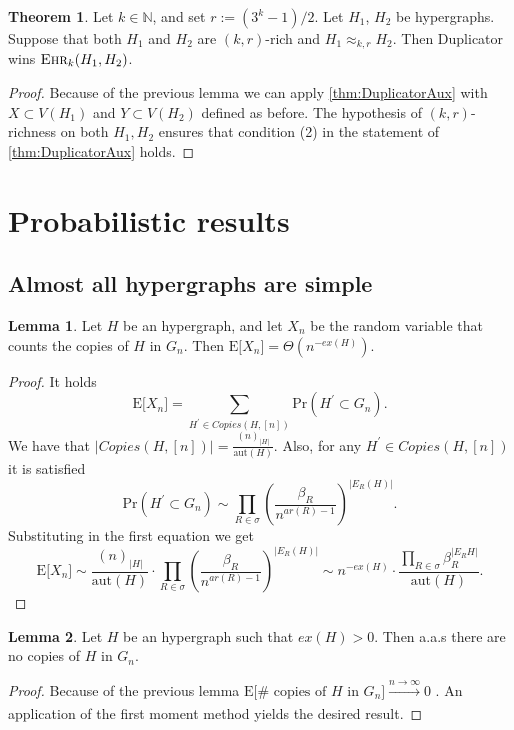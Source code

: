 \documentclass[12pt,notitlepage,a4paper]{article}
\theoremstyle{definition}
\newtheorem{theorem}{Theorem}[section]
\newtheorem{lemma}{Lemma}[section]
\newcommand{\N}{\mathbb{N}}
\newcommand{\ehr}{\textsc{Ehr}}
\newcommand{\PR}[1]{\mathrm{Pr}\left(#1\right)}
\newcommand{\sep}{\noindent\rule{2cm}{0.4pt}}
\newcommand{\aut}{\mathrm{aut}}
\begin{document}
\begin{theorem}\label{thm:Duplicatorwins}
	Let $k\in \N$, and set $r:=(3^k-1)/2$.
	Let $H_1$, $H_2$ be hypergraphs.
	Suppose
	that both $H_1$ and $H_2$ are $(k,r)$-rich and
	$H_1\approx_{k,r} H_2$. Then Duplicator wins $\ehr_{k}(H_1,H_2)$.
\end{theorem}
	\begin{proof}
		Because of the previous lemma we can apply 
		\cref{thm:DuplicatorAux} with $X\subset V(H_1)$ 
		and	$Y\subset V(H_2)$ defined as before. The
		hypothesis of $(k,r)$-richness on both $H_1, H_2$ ensures that
		condition (2) in the statement of \cref{thm:DuplicatorAux}
		holds. 
	\end{proof}


\section{Probabilistic results}



\subsection{Almost all hypergraphs are simple}

\begin{lemma}
	Let $H$ be an hypergraph, and let $X_n$ be the 
	random variable that counts the copies of $H$ in 
	$G_n$. Then 
	$\mathrm{E}\big[X_n\big]=\Theta(n^{-ex(H)})$.  
\end{lemma}
\begin{proof}
It holds
\[
 \mathrm{E}\big[X_n\big]=
 \sum_{H^\prime \in Copies(H,[n])} \PR{H^\prime \subset G_n}.
\]	
We have that $\Big|Copies(H,[n])\Big|=\frac{(n)_{|H|}}{\aut(H)}$. Also, 
for any $H^\prime \in Copies(H,[n])$ it is satisfied
\[
\PR{H^\prime \subset G_n}\sim \prod_{R\in \sigma} \left(\frac{\beta_R}{n^{ar(R)-1}} 
\right)^{|E_R(H)|}.
\]
Substituting in the first equation we get
\[
\mathrm{E}\big[X_n\big]\sim 
\frac{(n)_{|H|}}{\aut(H)}\cdot
\prod_{R\in \sigma} \left(\frac{\beta_R}{n^{ar(R)-1}}\right)^{|E_R(H)|}
\sim
n^{-ex(H)} \cdot \frac{\prod_{R\in \sigma} \beta_R^{
|E_R{H}| }}{\aut(H)}.
\]	
\end{proof}


\begin{lemma} \label{lem:nocopiesdense}
	Let $H$ be an hypergraph such that $ex(H)>0$. Then
	a.a.s there are no copies of $H$ in $G_n$. 
\end{lemma}  
\begin{proof}
	Because of the previous lemma
	$\mathrm{E}\big[\# \text{ copies of }H \text{ in } G_n\big] 
	\xrightarrow[]{n\to \infty} 0$ . An application of the first moment
	method yields the desired result. 
\end{proof} 
\end{document}
